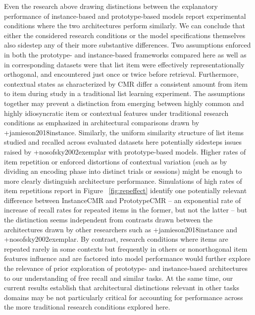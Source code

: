 {}Even the research above drawing distinctions between the explanatory performance of instance-based and prototype-based models report experimental conditions where the two architectures perform similarly. We can conclude that either the considered research conditions or the model specifications themselves also sidestep any of their more substantive differences. Two assumptions enforced in both the prototype- and instance-based frameworks compared here as well as in corresponding datasets were that list item were effectively representationally orthogonal, and encountered just once or twice before retrieval. Furthermore, contextual states as characterized by CMR differ a consistent amount from item to item during study in a traditional list learning experiment. The assumptions together may prevent a distinction from emerging between highly common and highly idiosyncratic item or contextual features under traditional research conditions as emphasized in architectural comparisons drawn by +{}{}{jamieson2018instance}. Similarly, the uniform similarity structure of list items studied and recalled across evaluated datasets here potentially sidesteps issues raised by +{}{}{nosofsky2002exemplar} with prototype-based models.\markdownRendererInterblockSeparator
{}Higher rates of item repetition or enforced distortions of contextual variation (such as by dividing an encoding phase into distinct trials or sessions) might be enough to more clearly distinguish architecture performance. Simulations of high rates of item repetitions report in Figure ~\ref{fig:repeffect} identify one potentially relevant difference between InstanceCMR and PrototypeCMR -- an exponential rate of increase of recall rates for repeated items in the former, but not the latter -- but the distinction seems independent from contrasts drawn between the architectures drawn by other researchers such as +{}{}{jamieson2018instance} and +{}{}{nosofsky2002exemplar}. By contrast, research conditions where items are repeated rarely in some contexts but frequently in others or nonorthogonal item features influence and are factored into model performance would further explore the relevance of prior exploration of prototype- and instance-based architectures to our understanding of free recall and similar tasks. At the same time, our current results establish that architectural distinctions relevant in other tasks domains may be not particularly critical for accounting for performance across the more traditional research conditions explored here.\markdownRendererInterblockSeparator
